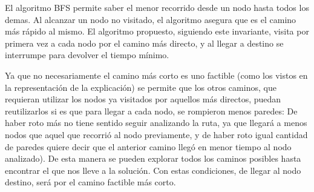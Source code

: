 El algoritmo BFS permite saber el menor recorrido desde un nodo hasta todos los demas. Al alcanzar un nodo no visitado, el algoritmo asegura que es el camino más rápido al mismo. El algoritmo propuesto, siguiendo este invariante, visita por primera vez a cada nodo por el camino más directo, y al llegar a destino se interrumpe para devolver el tiempo mínimo.

Ya que no necesariamente el camino más corto es uno factible (como los vistos en la representación de la explicación) se permite que los otros caminos, que requieran utilizar los nodos ya visitados por aquellos más directos, puedan reutilizarlos si es que para llegar a cada nodo, se rompieron menos paredes: De haber roto más no tiene sentido seguir analizando la ruta, ya que llegará a menos nodos que aquel que recorrió al nodo previamente, y de haber roto igual cantidad de paredes quiere decir que el anterior camino llegó en menor tiempo al nodo analizado). De esta manera se pueden explorar todos los caminos posibles hasta encontrar el que nos lleve a la solución. Con estas condiciones, de llegar al nodo destino, será por el camino factible más corto.